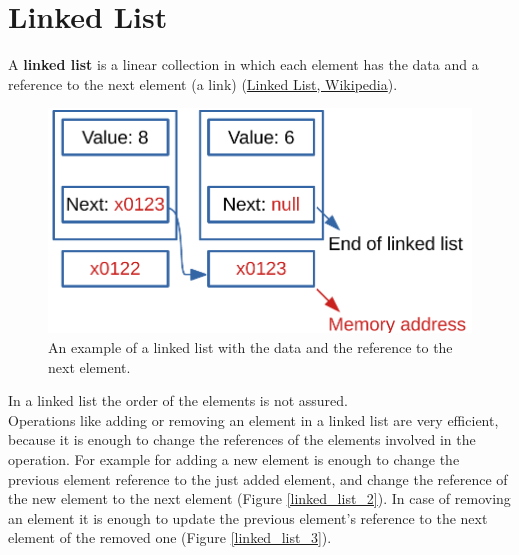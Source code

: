 \section{Linked List}
\label{linkedlist}
A \textbf{linked list} is a linear collection in which each element has the data and a reference to the next element (a link) \cite{wikilinkedlist} (\href{https://en.wikipedia.org/wiki/Linked_list}{Linked List, Wikipedia}). 
\begin{figure}[H]
	\begin{center}
		\includegraphics[scale=.6]{chapters/datastructures/images/linked_list_1.pdf}
		\caption[An example of a linked list with the data and the reference to the next element.]{An example of a linked list with the data and the reference to the next element.}
		\label{linked_list_1}
	\end{center}
\end{figure}
In a linked list the order of the elements is not assured. 
\\
Operations like adding or removing an element in a linked list are very efficient, because it is enough to change the references of the elements involved in the operation. For example for adding a new element is enough to change the previous element reference to the just added element, and change the reference of the new element to the next element (Figure \ref{linked_list_2}). In case of removing an element it is enough to update the previous element's reference to the next element of the removed one (Figure \ref{linked_list_3}). 
